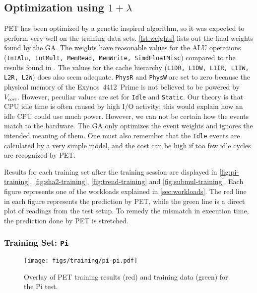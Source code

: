 \subsection{Optimization using $1 + \lambda$}

PET has been optimized by a genetic inspired algorithm, so it was expected to
perform very well on the training data sets. \autoref{lst:weights} lists out the
final weights found by the GA. The weights have reasonable values for the ALU
operations (\texttt{IntAlu, IntMult, MemRead, MemWrite, SimdFloatMisc}) compared
to the results found in \cite{rundehvatum2013exploring}. The values for the
cache hierarchy (\texttt{L1DR, L1DW, L1IR, L1IW, L2R, L2W}) does also seem
adequate. \texttt{PhysR} and \texttt{PhysW} are set to zero because the physical
memory of the Exynos~4412~Prime is not believed to be powered by $V_{core}$.
However, peculiar values are set for \texttt{Idle} and \texttt{Static}. Our
theory is that CPU idle time is often caused by high I/O activity; this would
explain how an idle CPU could use much power. However, we can not be certain how
the events match to the hardware. The GA only optimizes the event weights and
ignores the intended meaning of them. One must also remember that the
\texttt{Idle} events are calculated by a very simple model, and the cost can
be high if too few idle cycles are recognized by PET.



Results for each training set after the training session are displayed in
\autoref{fig:pi-training}, \autoref{fig:sha2-training},
\autoref{fig:trend-training} and \autoref{fig:submul-training}. Each figure
represents one of the workloads explained in \autoref{sec:workloads}. The red
line in each figure represents the prediction by PET, while the green line is a
direct plot of readings from the test setup. To remedy the mismatch in execution
time, the prediction done by PET is stretched.


\subsubsection{Training Set: \texttt{Pi}}
\begin{figure}[htb]
    \centering
    \texttt{[image: figs/training/pi-pi.pdf]}
    \caption{Overlay of PET training results (red) and training data (green) for the Pi test.}
    \label{fig:pi-training}
\end{figure}

